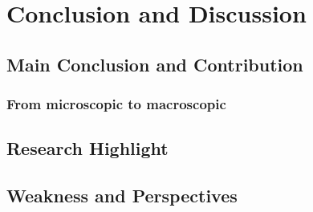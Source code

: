 \chapter{Conclusion and Discussion}

\section{Main Conclusion and Contribution}

\subsection{From microscopic to macroscopic}


\section{Research Highlight}

\section{Weakness and Perspectives}